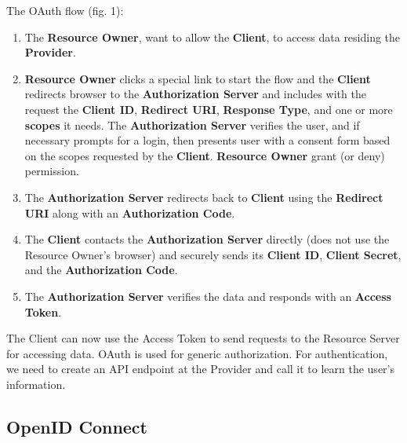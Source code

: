 	The OAuth flow (fig. 1):
	\begin{enumerate}
		\item The \textbf{Resource Owner}, want to allow the \textbf{Client}, to access data residing the \textbf{Provider}.
		
		\item \textbf{Resource Owner} clicks a special link to start the flow and the \textbf{Client} redirects browser to the \textbf{Authorization Server} and includes with the request the \textbf{Client ID}, \textbf{Redirect URI}, \textbf{Response Type}, and one or more \textbf{scopes} it needs. The \textbf{Authorization Server} verifies the user, and if necessary prompts for a login, then presents user with a consent form based on the scopes requested by the \textbf{Client}. \textbf{Resource Owner} grant (or deny) permission.
		
		\item The \textbf{Authorization Server} redirects back to \textbf{Client} using the \textbf{Redirect URI} along with an \textbf{Authorization Code}.
		
		\item The \textbf{Client} contacts the \textbf{Authorization Server} directly (does not use the Resource Owner’s browser) and securely sends its \textbf{Client ID}, \textbf{Client Secret}, and the \textbf{Authorization Code}.
		
		\item The \textbf{Authorization Server} verifies the data and responds with an \textbf{Access Token}.
		
	\end{enumerate}
The Client can now use the Access Token to send requests to the Resource Server for accessing data. OAuth is used for generic authorization. For authentication, we need to create an API endpoint at the Provider and call it to learn the user's information.



\subsection{OpenID Connect}

